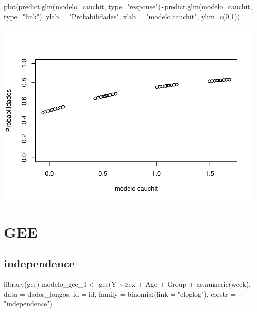 \documentclass[
]{article}
\newenvironment{Shaded}{\begin{snugshade}}{\end{snugshade}}
\newcommand{\AttributeTok}[1]{\textcolor[rgb]{0.77,0.63,0.00}{#1}}
\newcommand{\DecValTok}[1]{\textcolor[rgb]{0.00,0.00,0.81}{#1}}
\newcommand{\FunctionTok}[1]{\textcolor[rgb]{0.00,0.00,0.00}{#1}}
\newcommand{\NormalTok}[1]{#1}
\newcommand{\OtherTok}[1]{\textcolor[rgb]{0.56,0.35,0.01}{#1}}
\newcommand{\SpecialCharTok}[1]{\textcolor[rgb]{0.00,0.00,0.00}{#1}}
\newcommand{\StringTok}[1]{\textcolor[rgb]{0.31,0.60,0.02}{#1}}
\begin{document}
\begin{Shaded}
\begin{Highlighting}[]
\FunctionTok{plot}\NormalTok{(}\FunctionTok{predict.glm}\NormalTok{(modelo\_cauchit, }\AttributeTok{type=}\StringTok{"response"}\NormalTok{)}\SpecialCharTok{\textasciitilde{}}\FunctionTok{predict.glm}\NormalTok{(modelo\_cauchit, }\AttributeTok{type=}\StringTok{"link"}\NormalTok{),}
     \AttributeTok{ylab =} \StringTok{"Probabilidades"}\NormalTok{,}
     \AttributeTok{xlab =}  \StringTok{"modelo cauchit"}\NormalTok{,}
     \AttributeTok{ylim=}\FunctionTok{c}\NormalTok{(}\DecValTok{0}\NormalTok{,}\DecValTok{1}\NormalTok{))}
\end{Highlighting}
\end{Shaded}

\includegraphics{EDA__files/figure-latex/unnamed-chunk-12-2.pdf}

\hypertarget{gee}{%
\section{GEE}\label{gee}}

\hypertarget{independence}{%
\subsection{independence}\label{independence}}

\begin{Shaded}
\begin{Highlighting}[]
\FunctionTok{library}\NormalTok{(gee) }
\NormalTok{modelo\_gee\_1 }\OtherTok{\textless{}{-}} \FunctionTok{gee}\NormalTok{(Y }\SpecialCharTok{\textasciitilde{}}\NormalTok{ Sex }\SpecialCharTok{+}\NormalTok{ Age }\SpecialCharTok{+}\NormalTok{ Group }\SpecialCharTok{+} \FunctionTok{as.numeric}\NormalTok{(week), }
               \AttributeTok{data =}\NormalTok{ dados\_longos, }
               \AttributeTok{id =}\NormalTok{ id, }
               \AttributeTok{family =} \FunctionTok{binomial}\NormalTok{(}\AttributeTok{link =} \StringTok{"cloglog"}\NormalTok{),}
               \AttributeTok{corstr =} \StringTok{"independence"}\NormalTok{)}
\end{Highlighting}
\end{Shaded}
\end{document}
